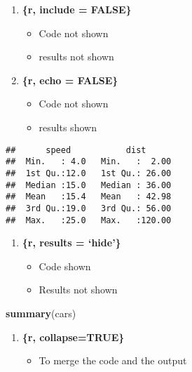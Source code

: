 \documentclass[]{article}
\newenvironment{Shaded}{\begin{snugshade}}{\end{snugshade}}
\newcommand{\KeywordTok}[1]{\textcolor[rgb]{0.13,0.29,0.53}{\textbf{#1}}}
\newcommand{\NormalTok}[1]{#1}
\providecommand{\tightlist}{%
  \setlength{\itemsep}{0pt}\setlength{\parskip}{0pt}}
\begin{document}
\begin{enumerate}
\def\labelenumi{\arabic{enumi}.}
\tightlist
\item
  \textbf{\{r, include = FALSE\}}

  \begin{itemize}
  \tightlist
  \item
    Code not shown\\
  \item
    results not shown\\
  \end{itemize}
\item
  \textbf{\{r, echo = FALSE\}}

  \begin{itemize}
  \tightlist
  \item
    Code not shown
  \item
    results shown
  \end{itemize}
\end{enumerate}

\begin{verbatim}
##      speed           dist       
##  Min.   : 4.0   Min.   :  2.00  
##  1st Qu.:12.0   1st Qu.: 26.00  
##  Median :15.0   Median : 36.00  
##  Mean   :15.4   Mean   : 42.98  
##  3rd Qu.:19.0   3rd Qu.: 56.00  
##  Max.   :25.0   Max.   :120.00
\end{verbatim}

\begin{enumerate}
\def\labelenumi{\arabic{enumi}.}
\setcounter{enumi}{2}
\tightlist
\item
  \textbf{\{r, results = `hide'\}}

  \begin{itemize}
  \tightlist
  \item
    Code shown\\
  \item
    Results not shown
  \end{itemize}
\end{enumerate}

\begin{Shaded}
\begin{Highlighting}[]
\KeywordTok{summary}\NormalTok{(cars)}
\end{Highlighting}
\end{Shaded}

\begin{enumerate}
\def\labelenumi{\arabic{enumi}.}
\setcounter{enumi}{3}
\tightlist
\item
  \textbf{\{r, collapse=TRUE\}}

  \begin{itemize}
  \tightlist
  \item
    To merge the code and the output
  \end{itemize}
\end{enumerate}
\end{document}
